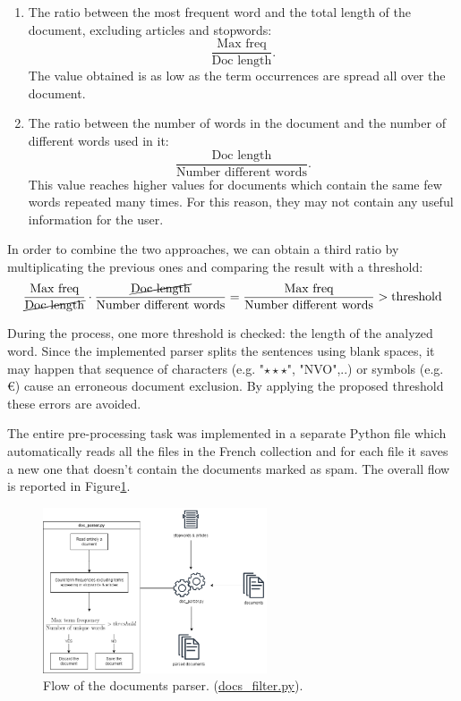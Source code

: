 \begin{enumerate}
    \item The ratio between the most frequent word and the total length of the document, excluding articles and stopwords: 
    \begin{equation}
        \frac{\text{Max freq}}{\text{Doc length}}.
    \end{equation} 
    The value obtained is as low as the term occurrences are spread all over the document.
    \item The ratio between the number of words in the document and the number of different words used in it:
    \begin{equation}
        \frac{\text{Doc length}}{\text{Number different words}}.
    \end{equation} This value reaches higher values for documents which contain the same few words repeated many times. For this reason, they may not contain any useful information for the user.  
\end{enumerate}
In order to combine the two approaches, we can obtain a third ratio by multiplicating the previous ones and comparing the result with a threshold:
\begin{equation}
    \frac{\text{Max freq}}{\cancel{\text{Doc length}}} \cdot \frac{\cancel{\text{Doc length}}}{\text{Number different words}} = \frac{\text{Max freq}}{\text{Number different words}} > \text{threshold}
\end{equation}
\par
During the process, one more threshold is checked: the length of the analyzed word. Since the implemented parser splits the sentences using blank spaces, it may happen that sequence of characters (e.g. "$\star \star \star$", "NVO",..) or symbols (e.g. €) cause an erroneous document exclusion. By applying the proposed threshold these errors are avoided. 
\par
The entire pre-processing task was implemented in a separate Python file which automatically reads all the files in the French collection and for each file it saves a new one that doesn't contain the documents marked as spam. The overall flow is reported in Figure\ref{fig:doc_parser-figure}. 

\begin{figure}[tb]
  \centering
  \includegraphics[width=250px,scale=0.5]{figure/doc_parser-diagram.png}
  \caption{Flow of the documents parser. (\href{https://bitbucket.org/upd-dei-stud-prj/seupd2223-dards/src/french/docs_filter.py}{docs\_filter.py}).}
  \label{fig:doc_parser-figure}
\end{figure}

